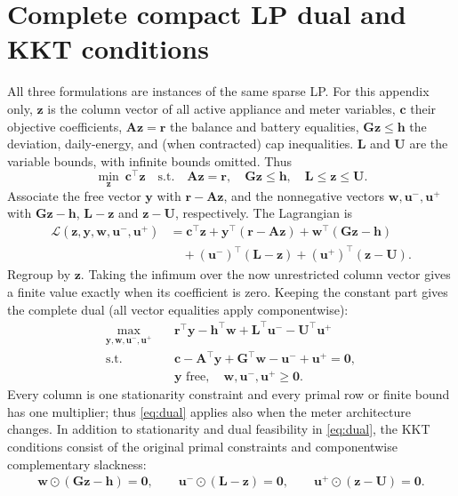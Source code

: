 \documentclass[10pt,a4paper]{article}
\begin{document}
\section{Complete compact LP dual and KKT conditions}
\label{app:dual}
All three formulations are instances of the same sparse LP. For this appendix only, $\bm z$ is the column vector of all active appliance and meter variables, $\bm c$ their objective coefficients, $\bm A\bm z=\bm r$ the balance and battery equalities, $\bm G\bm z\le\bm h$ the deviation, daily-energy, and (when contracted) cap inequalities. $\bm L$ and $\bm U$ are the variable bounds, with infinite bounds omitted. Thus
\begin{equation}
\min_{\bm z}\ \bm c^\top\bm z
\quad\text{s.t.}\quad
\bm A\bm z=\bm r,\quad \bm G\bm z\le\bm h,\quad
\bm L\le\bm z\le\bm U.
\end{equation}
Associate the free vector $\bm y$ with $\bm r-\bm A\bm z$, and the nonnegative vectors $\bm w,\bm u^-,\bm u^+$ with $\bm G\bm z-\bm h$, $\bm L-\bm z$ and $\bm z-\bm U$, respectively. The Lagrangian is
\begin{align}
\mathcal L(\bm z,\bm y,\bm w,\bm u^-,\bm u^+)
&=\bm c^\top\bm z+\bm y^\top(\bm r-\bm A\bm z)
 +\bm w^\top(\bm G\bm z-\bm h)\nonumber\\
&\quad+(\bm u^-)^\top(\bm L-\bm z)+(\bm u^+)^\top(\bm z-\bm U).
\end{align}
Regroup by $\bm z$. Taking the infimum over the now unrestricted column vector gives a finite value exactly when its coefficient is zero. Keeping the constant part gives the complete dual (all vector equalities apply componentwise):
\begin{subequations}\label{eq:dual}
\begin{align}
\max_{\bm y,\bm w,\bm u^-,\bm u^+}\quad
 &\bm r^\top\bm y-\bm h^\top\bm w+\bm L^\top\bm u^- -\bm U^\top\bm u^+\\
\text{s.t.}\quad
 &\bm c-\bm A^\top\bm y+\bm G^\top\bm w-\bm u^-+\bm u^+=\bm0,\\
 &\bm y\text{ free},\quad\bm w,\bm u^-,\bm u^+\ge\bm0.
\end{align}
\end{subequations}
Every column is one stationarity constraint and every primal row or finite bound has one multiplier; thus \eqref{eq:dual} applies also when the meter architecture changes. In addition to stationarity and dual feasibility in \eqref{eq:dual}, the KKT conditions consist of the original primal constraints and componentwise complementary slackness:
\begin{equation}
\begin{gathered}
\bm w\odot(\bm G\bm z-\bm h)=\bm0,\qquad
\bm u^-\odot(\bm L-\bm z)=\bm0,\qquad
\bm u^+\odot(\bm z-\bm U)=\bm0 .
\end{gathered}
\end{equation}
\end{document}
